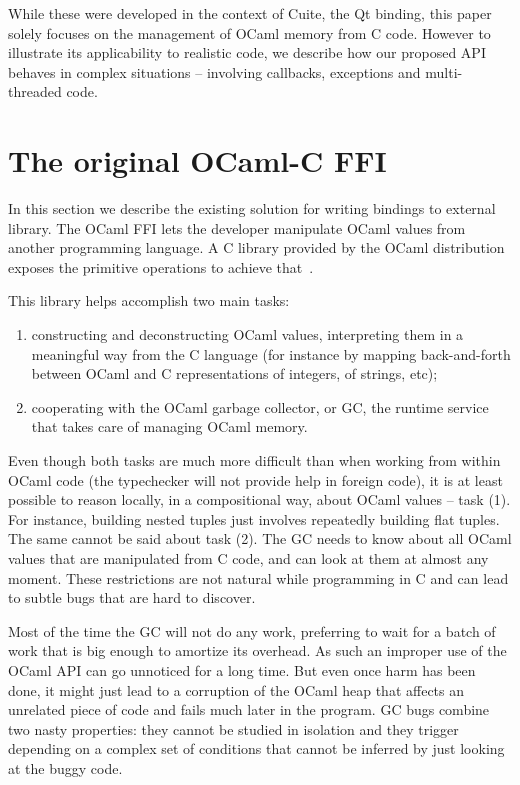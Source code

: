 \documentclass[a4paper]{easychair}
\begin{document}
While these were developed in the context of Cuite, the Qt binding, this
paper solely focuses on the management of OCaml memory from C code.
However to illustrate its applicability to realistic code, we describe
how our proposed API behaves in complex situations -- involving
callbacks, exceptions and multi-threaded code.

\section{The original OCaml-C FFI}

In this section we describe the existing solution for writing bindings to
external library.  The OCaml FFI lets the developer manipulate OCaml values
from another programming language. A C library provided by the OCaml
distribution exposes the primitive operations to achieve that~\citep{harmony}.

This library helps accomplish two main tasks:

\begin{enumerate}
\item constructing and deconstructing OCaml values, interpreting them in a
      meaningful way from the C language (for instance by mapping
      back-and-forth between OCaml and C representations of integers, of
      strings, etc);
\item cooperating with the OCaml garbage collector, or GC, the runtime
      service that takes care of managing OCaml memory.
\end{enumerate}

Even though both tasks are much more difficult than when working from
within OCaml code (the typechecker will not provide help in foreign code),
it is at least possible to reason locally, in a compositional way, about
OCaml values -- task (1). For instance, building nested tuples just
involves repeatedly building flat tuples.
The same cannot be said about task (2). The GC needs to know about all
OCaml values that are manipulated from C code, and can look at them at
almost any moment. These restrictions are not natural while programming
in C and can lead to subtle bugs that are hard to discover.

Most of the time the GC will not do any work, preferring to wait for a
batch of work that is big enough to amortize its overhead. As such an
improper use of the OCaml API can go unnoticed for a long time. But even
once harm has been done, it might just lead to a corruption of the OCaml
heap that affects an unrelated piece of code and fails much later in the
program.  GC bugs combine two nasty properties: they cannot be studied in
isolation and they trigger depending on a complex set of conditions that
cannot be inferred by just looking at the buggy code.
\end{document}
